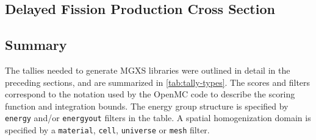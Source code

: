 \subsection{Delayed Fission Production Cross Section}
\label{subsubsec:tally-types-delay-fiss-prod}


\subsection{Summary}
\label{subsec:tally-types-summary}

The tallies needed to generate MGXS libraries were outlined in detail in the preceding sections, and are summarized in \autoref{tab:tally-types}. The scores and filters correspond to the notation used by the OpenMC code to describe the scoring function and integration bounds. The energy group structure is specified by \texttt{energy} and/or \texttt{energyout} filters in the table. A spatial homogenization domain is specified by a \texttt{material}, \texttt{cell}, \texttt{universe} or \texttt{mesh} filter.

